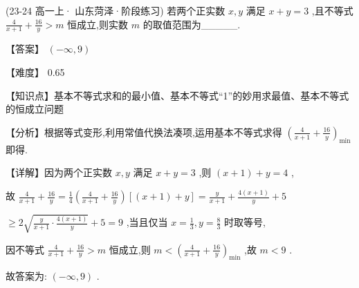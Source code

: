 \documentclass[11pt,a4paper]{article}
\begin{document}
\begin{hmwk} 
 (23-24 高一上· 山东菏泽·阶段练习) 若两个正实数 \(\displaystyle x,y\) 满足 \(\displaystyle x + y = 3\) ,且不等式 \(\displaystyle \frac{4}{x + 1} + \frac{16}{y} > m\) 恒成立,则实数 \(\displaystyle m\) 的取值范围为\_\_\_\_\_.

\begin{jiexi}
【答案】 \(\displaystyle \left( {-\infty ,9}\right)\)

【难度】 0.65

【知识点】基本不等式求和的最小值、基本不等式“1”的妙用求最值、基本不等式的恒成立问题

【分析】根据等式变形,利用常值代换法凑项,运用基本不等式求得 \(\displaystyle {\left( \frac{4}{x + 1} + \frac{16}{y}\right) }_{\min }\) 即得.

【详解】因为两个正实数 \(\displaystyle x,y\) 满足 \(\displaystyle x + y = 3\) ,则 \(\displaystyle \left( {x + 1}\right)  + y = 4\) ,

故 \(\displaystyle \frac{4}{x + 1} + \frac{16}{y} = \frac{1}{4}\left( {\frac{4}{x + 1} + \frac{16}{y}}\right) \left\lbrack  {\left( {x + 1}\right)  + y}\right\rbrack   = \frac{y}{x + 1} + \frac{4\left( {x + 1}\right) }{y} + 5\)

\(\displaystyle \geq  2\sqrt{\frac{y}{x + 1} \cdot  \frac{4\left( {x + 1}\right) }{y}} + 5 = 9\) ,当且仅当 \(\displaystyle x = \frac{1}{3},y = \frac{8}{3}\) 时取等号,

因不等式 \(\displaystyle \frac{4}{x + 1} + \frac{16}{y} > m\) 恒成立,则 \(\displaystyle m < {\left( \frac{4}{x + 1} + \frac{16}{y}\right) }_{\min }\) ,故 \(\displaystyle m < 9\) .

故答案为: \(\displaystyle \left( {-\infty ,9}\right)\) .



\end{jiexi}
\end{hmwk}
\end{document}

